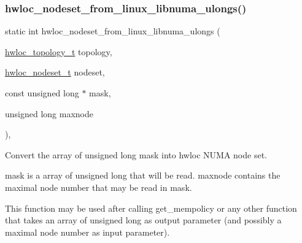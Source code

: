 \subsubsection{\texorpdfstring{hwloc\+\_\+nodeset\+\_\+from\+\_\+linux\+\_\+libnuma\+\_\+ulongs()}{hwloc\_nodeset\_from\_linux\_libnuma\_ulongs()}}
{\footnotesize\ttfamily static int hwloc\+\_\+nodeset\+\_\+from\+\_\+linux\+\_\+libnuma\+\_\+ulongs (\begin{DoxyParamCaption}\item[{\hyperlink{a00186_ga9d1e76ee15a7dee158b786c30b6a6e38}{hwloc\+\_\+topology\+\_\+t}}]{topology,  }\item[{\hyperlink{a00183_ga37e35730fa7e775b5bb0afe893d6d508}{hwloc\+\_\+nodeset\+\_\+t}}]{nodeset,  }\item[{const unsigned long $\ast$}]{mask,  }\item[{unsigned long}]{maxnode }\end{DoxyParamCaption})\hspace{0.3cm}{\ttfamily [inline]}, {\ttfamily [static]}}



Convert the array of unsigned long {\ttfamily mask} into hwloc N\+U\+MA node set. 

{\ttfamily mask} is a array of unsigned long that will be read. {\ttfamily maxnode} contains the maximal node number that may be read in {\ttfamily mask}.

This function may be used after calling get\+\_\+mempolicy or any other function that takes an array of unsigned long as output parameter (and possibly a maximal node number as input parameter). \mbox{\label{a00215_ga585ccf818d2f217f4e53f9c6506c3128}} 
